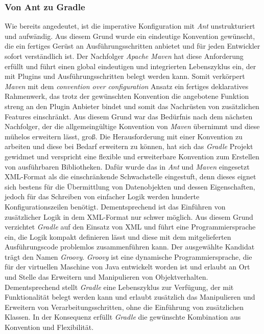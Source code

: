 		\subsubsection{Von Ant zu Gradle}%
		Wie bereits angedeutet, ist die imperative Konfiguration mit \textit{Ant} unstrukturiert und aufwändig. Aus diesem Grund wurde ein eindeutige Konvention gewünscht, die ein fertiges Gerüst an Ausführungsschritten anbietet und für jeden Entwickler sofort verständlich ist. Der Nachfolger \textit{Apache Maven} hat diese Anforderung erfüllt und führt einen global eindeutigen und integrierten Lebenszyklus ein, der mit Plugins und Ausführungsschritten belegt werden kann. Somit verkörpert \textit{Maven} mit dem \textit{convention over configuration} Ansatz ein fertiges deklaratives Rahmenwerk, das trotz der gewünschten Konvention die angebotene Funktion streng an den Plugin Anbieter bindet und somit das Nachrüsten von zusätzlichen Features einschränkt. Aus diesem Grund war das Bedürfnis nach dem nächsten Nachfolger, der die allgemeingültige Konvention von \textit{Maven} übernimmt und diese mühelos erweitern lässt, groß.\bigbreak
		Die Herausforderung mit einer Konvention zu arbeiten und diese bei Bedarf erweitern zu können, hat sich das \textit{Gradle} Projekt gewidmet und verspricht eine flexible und erweiterbare Konvention zum Erstellen von ausführbaren Bibliotheken.\newline
		Dafür wurde das in \textit{Ant} und \textit{Maven} eingesetzt XML-Format als die einschränkende Schwachstelle eingestuft, denn dieses eignet sich bestens für die Übermittlung von Datenobjekten und dessen Eigenschaften, jedoch für das Schreiben von einfacher Logik werden hunderte Konfigurationszeilen benötigt. Dementsprechend ist das Einführen von zusätzlicher Logik in dem XML-Format nur schwer möglich. Aus diesem Grund verzichtet \textit{Gradle} auf den Einsatz von XML und führt eine Programmiersprache ein, die Logik kompakt definieren lässt und diese mit dem mitgelieferten Ausführungscode problemlos zusammenführen kann. \newline
		Der ausgewählte Kandidat trägt den Namen \textit{Groovy}. \textit{Groovy} ist eine dynamische Programmiersprache, die für der virtuellen Maschine von Java entwickelt worden ist und erlaubt an Ort und Stelle das Erweitern und Manipulieren von Objektverhalten.\newline
		Dementsprechend stellt \textit{Gradle} eine Lebenszyklus zur Verfügung, der mit Funktionalität belegt werden kann und erlaubt zusätzlich das Manipulieren und Erweitern von Verarbeitungsschritten, ohne die Einführung von zusätzlichen Klassen. In der Konsequenz erfüllt \textit{Gradle} die gewünschte Kombination aus Konvention und Flexibilität.
		
